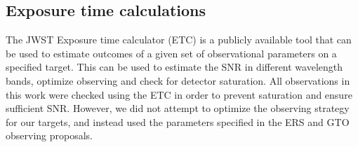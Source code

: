 \subsection{Exposure time calculations}
The JWST Exposure time calculator (ETC) is a publicly available tool that can be used to estimate outcomes of a given set of observational parameters on a specified target.
This can be used to estimate the SNR in different wavelength bands, optimize observing  and check for detector saturation.
All observations in this work were checked using the ETC in order to prevent saturation and ensure sufficient SNR.
However, we did not attempt to optimize the observing strategy for our targets, and instead used the parameters specified in the ERS and GTO observing proposals.